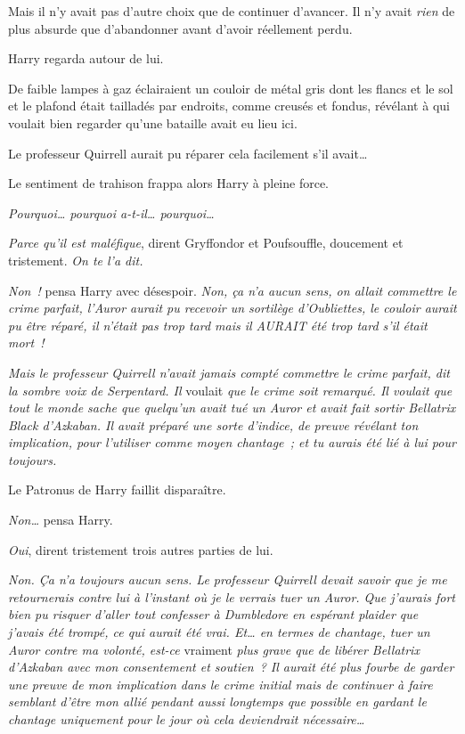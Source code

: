 Mais il n'y avait pas d'autre choix que de continuer d'avancer. Il n'y avait \emph{rien} de plus absurde que d'abandonner avant d'avoir réellement perdu.

Harry regarda autour de lui.

De faible lampes à gaz éclairaient un couloir de métal gris dont les flancs et le sol et le plafond était tailladés par endroits, comme creusés et fondus, révélant à qui voulait bien regarder qu'une bataille avait eu lieu ici.

Le professeur Quirrell aurait pu réparer cela facilement s'il avait…

Le sentiment de trahison frappa alors Harry à pleine force.

\emph{Pourquoi… pourquoi a-t-il… pourquoi…}

\emph{Parce qu'il est maléfique}, dirent Gryffondor et Poufsouffle, doucement et tristement. \emph{On te l'a dit.}

\emph{Non~!} pensa Harry avec désespoir. \emph{Non, ça n'a aucun sens, on allait commettre le crime parfait, l'Auror aurait pu recevoir un sortilège d'Oubliettes, le couloir aurait pu être réparé, il n'était pas trop tard mais il AURAIT été trop tard s'il était mort~!}

\emph{Mais le professeur Quirrell n'avait jamais compté commettre le crime parfait, dit la sombre voix de Serpentard. Il} voulait \emph{que le crime soit remarqué. Il voulait que tout le monde sache que quelqu'un avait tué un Auror et avait fait sortir Bellatrix Black d'Azkaban. Il avait préparé une sorte d'indice, de preuve révélant ton implication, pour l'utiliser comme moyen chantage~; et tu aurais été lié à lui pour toujours.}

Le Patronus de Harry faillit disparaître.

\emph{Non…} pensa Harry.

\emph{Oui}, dirent tristement trois autres parties de lui.

\emph{Non. Ça n'a toujours aucun sens. Le professeur Quirrell devait savoir que je me retournerais contre lui à l'instant où je le verrais tuer un Auror. Que j'aurais fort bien pu risquer d'aller tout confesser à Dumbledore en espérant plaider que j'avais été trompé, ce qui aurait été vrai. Et… en termes de chantage, tuer un Auror contre ma volonté, est-ce} vraiment \emph{plus grave que de libérer Bellatrix d'Azkaban avec mon consentement et soutien~? Il aurait été plus fourbe de garder une preuve de mon implication dans le crime initial mais de continuer à faire semblant d'être mon allié pendant aussi longtemps que possible en gardant le chantage uniquement pour le jour où cela deviendrait nécessaire…}

